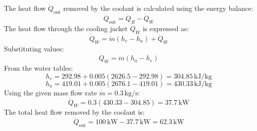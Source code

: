 The heat flow \( \dot{Q}_{\text{out}} \) removed by the coolant is calculated using the energy balance:  
\[
\dot{Q}_{\text{out}} = \dot{Q}_R - \dot{Q}_W
\]  
The heat flow through the cooling jacket \( \dot{Q}_W \) is expressed as:  
\[
\dot{Q}_W = \dot{m} (h_e - h_a) + \dot{Q}_W
\]  
Substituting values:  
\[
\dot{Q}_W = \dot{m} (h_a - h_e)
\]  
From the water tables:  
\[
h_e = 292.98 + 0.005 (2626.5 - 292.98) = 304.85 \, \text{kJ/kg}
\]  
\[
h_a = 419.01 + 0.005 (2676.1 - 419.01) = 430.33 \, \text{kJ/kg}
\]  
Using the given mass flow rate \( \dot{m} = 0.3 \, \text{kg/s} \):  
\[
\dot{Q}_W = 0.3 (430.33 - 304.85) = 37.7 \, \text{kW}
\]  
The total heat flow removed by the coolant is:  
\[
\dot{Q}_{\text{out}} = 100 \, \text{kW} - 37.7 \, \text{kW} = 62.3 \, \text{kW}
\]